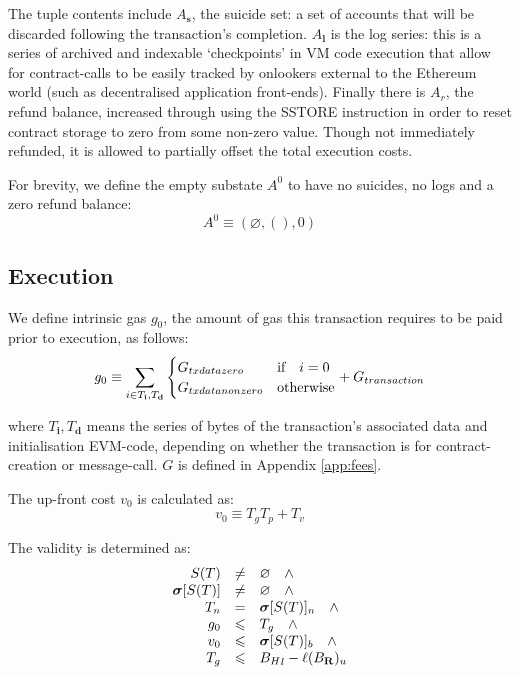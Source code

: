 \documentclass[9pt,oneside]{amsart}
\begin{document}
\begin{multicols}{2}
The tuple contents include $A_\mathbf{s}$, the suicide set: a set of accounts that will be discarded following the transaction's completion. $A_\mathbf{l}$ is the log series: this is a series of archived and indexable `checkpoints' in VM code execution that allow for contract-calls to be easily tracked by onlookers external to the Ethereum world (such as decentralised application front-ends). Finally there is $A_r$, the refund balance, increased through using the {\small SSTORE} instruction in order to reset contract storage to zero from some non-zero value. Though not immediately refunded, it is allowed to partially offset the total execution costs.

For brevity, we define the empty substate $A^0$ to have no suicides, no logs and a zero refund balance:
\begin{equation}
A^0 \equiv (\varnothing, (), 0)
\end{equation}

\subsection{Execution}
We define intrinsic gas $g_0$, the amount of gas this transaction requires to be paid prior to execution, as follows:
\begin{equation}
g_0 \equiv \sum_{i \in T_\mathbf{i}, T_\mathbf{d}} \begin{cases} G_{txdatazero} & \text{if} \quad i = 0 \\ G_{txdatanonzero} & \text{otherwise} \end{cases} + G_{transaction}\\
\end{equation}

where $T_\mathbf{i},T_\mathbf{d}$ means the series of bytes of the transaction's associated data and initialisation EVM-code, depending on whether the transaction is for contract-creation or message-call. $G$ is defined in Appendix \ref{app:fees}.


The up-front cost $v_0$ is calculated as:
\begin{equation}
v_0 \equiv T_g T_p + T_v
\end{equation}

The validity is determined as:
\begin{equation}
\begin{array}[t]{rcl}
S(T) & \neq & \varnothing \quad \wedge \\
\boldsymbol{\sigma}[S(T)] & \neq & \varnothing \quad \wedge \\
T_n & = & \boldsymbol{\sigma}[S(T)]_n \quad \wedge \\
g_0 & \leqslant & T_g \quad \wedge \\ 
v_0 & \leqslant & \boldsymbol{\sigma}[S(T)]_b \quad \wedge \\
T_g & \leqslant & {B_H}_l - \ell(B_\mathbf{R})_u
\end{array}
\end{equation}


\end{multicols}
\end{document}
